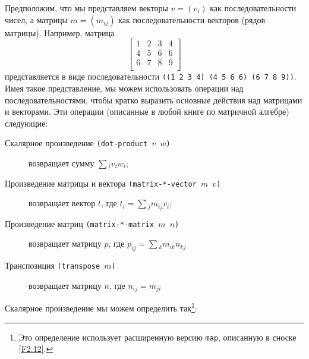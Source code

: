 \begin{exercise}{2.37}\label{EX2.37}%
%
%
%
%
% 
Предположим, что мы представляем векторы $v =
(v_i)$ как последовательности чисел, а матрицы $m
=(m_{ij})$ как последовательности векторов (рядов матрицы).
Например, матрица
$$
\left\lbrack
  \begin{array}{rrrr}
    1 & 2 & 3 & 4 \\
    4 & 5 & 6 & 6 \\
    6 & 7 & 8 & 9 \\ 
  \end{array}
\right\rbrack
$$
представляется в виде последовательности
{\tt ((1 2 3 4) (4 5 6 6) (6 7 8 9))}.  Имея такое
представление, мы можем использовать операции над
последовательностями, чтобы кратко выразить основные действия над
матрицами и векторами.  Эти операции (описанные в любой книге по
матричной алгебре) следующие:
\sloppy

\pagebreak

\begin{description}

\item[Скалярное произведение {\tt (dot-product $v$
      $w$)}] возвращает сумму $\sum{}_i v_i w_i$;

\item[Произведение матрицы и вектора {\tt (matrix-*-vector $m$
      $v$)}] возвращает вектор $t$, где $t_i 
  = \sum{}_j m_{ij} v_i$;

\item[Произведение матриц {\tt (matrix-*-matrix $m$
      $n$)}] возвращает матрицу $p$, где\linebreak
  $p_{ij} = \sum{}_k m_{ik} n_{kj}$
  
\item[Транспозиция {\tt (transpose $m$)}] возвращает матрицу $n$, где
  $n_{ij} = m_{ji}$
\end{description}
Скалярное произведение мы можем определить так\footnote{Это
  определение использует расширенную версию 
  {\tt map}, описанную в сноске \ref{F2.12}.}:


\end{exercise}
